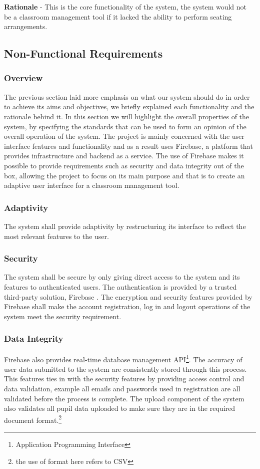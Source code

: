 \textbf{Rationale} - This is the core functionality of the system, the system would not be a classroom management tool if it lacked the ability to perform seating arrangements.

\subsection{Non-Functional Requirements}
\subsubsection{Overview}
The previous section laid more emphasis on what our system should do in order to achieve its aims and objectives, we briefly explained each functionality and the rationale behind it. In this section we will highlight the overall properties of the system, by specifying the standards that can be used to form an opinion of the overall operation of the system. The project is mainly concerned with the user interface features and functionality and as a result uses Firebase\cite{website:Firebase}, a platform that provides infrastructure and backend as a service. The use of Firebase makes it possible to provide requirements such as security and data integrity out of the box, allowing the project to focus on its main purpose and that is to create an adaptive user interface for a classroom management tool.

\subsubsection{Adaptivity}
The system shall provide adaptivity by restructuring its interface to reflect the most relevant features to the user. 

\subsubsection{Security}
The system shall be secure by only giving direct access to the system and its features to authenticated users. The authentication is provided by a trusted third-party solution, Firebase \cite{website:Firebase}. The encryption and security features provided by Firebase shall make the account registration, log in and logout operations of the system meet the security requirement.

\subsubsection{Data Integrity}
Firebase also provides real-time database management API\footnote{Application Programming Interface}. The accuracy of user data submitted to the system are consistently stored through this process. This features ties in with the security features by providing access control and data validation, example all emails and passwords used in registration are all validated before the process is complete. The upload component of the system also validates all pupil data uploaded to make sure they are in the required document format.\footnote{the use of format here refers to CSV}

